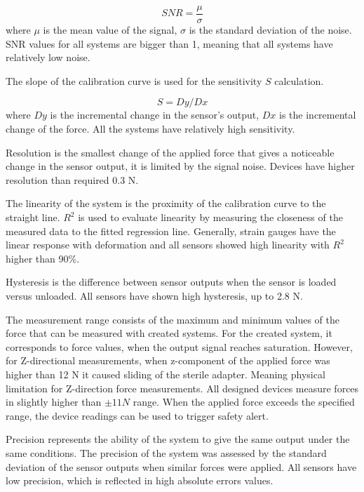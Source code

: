 \begin{equation}
SNR=\frac{\mu}{\sigma}
\end{equation}
where $\mu$ is the mean value of the signal, $\sigma$ is the standard deviation of the noise. SNR values for all systems are bigger than 1, meaning that all systems have relatively low noise.

The slope of the calibration curve is used for the sensitivity $S$ calculation.

\begin{equation}
S = Dy/Dx
\end{equation}
where $Dy$ is the incremental change in the sensor’s output, $Dx$ is the incremental change of the force. All the systems have relatively high sensitivity.

Resolution is the smallest change of the applied force that gives a noticeable change in the sensor output, it is limited by the signal noise. Devices have higher resolution than required 0.3 N.

The linearity of the system is the proximity of the calibration curve to the straight line. $R^2$ is used to evaluate linearity by measuring the closeness of the measured data to the fitted regression line. Generally, strain gauges have the linear response with deformation and all sensors showed high linearity with $R^2$ higher than 90\%.

Hysteresis is the difference between sensor outputs when the sensor is loaded versus unloaded. All sensors have shown high hysteresis, up to 2.8 N.

The measurement range consists of the maximum and minimum values of the force that can be measured with created systems. For the created system, it corresponds to force values, when the output signal reaches saturation. However, for Z-directional measurements, when z-component of the applied force was higher than 12 N it caused sliding of the sterile adapter. Meaning physical limitation for Z-direction force measurements. All designed devices measure forces in slightly higher than $\pm 11 N$ range. When the applied force exceeds the specified range, the device readings can be used to trigger safety alert.

Precision represents the ability of the system to give the same output under the same conditions. The precision of the system was assessed by the standard deviation of the sensor outputs when similar forces were applied.  All sensors have low precision, which is reflected in high absolute errors values.

